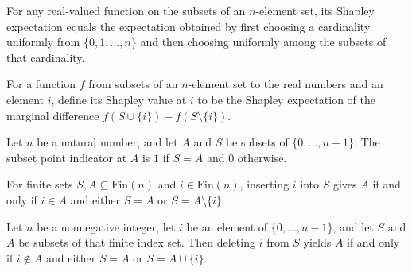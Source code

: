 \begin{theorem}
\label{FABL.shapleyExpectation_eq_uniform_cardinality_then_subset}
\leanok
{}
For any real-valued function on the subsets of an $n$-element set, its Shapley
expectation equals the expectation obtained by first choosing a cardinality uniformly
from $\{0,1,\ldots,n\}$ and then choosing uniformly among the subsets of that cardinality.
\end{theorem}

\begin{definition}
\label{FABL.shapleyValue}
\leanok
{}
For a function $f$ from subsets of an $n$-element set to the real numbers and an element
$i$, define its Shapley value at $i$ to be the Shapley expectation of the marginal
difference $f(S\cup\{i\})-f(S\setminus\{i\})$.
\end{definition}

\begin{definition}
\label{FABL.subsetPointIndicator}
\leanok
Let $n$ be a natural number, and let $A$ and $S$ be subsets of $\{0,\ldots,n-1\}$. The
subset point indicator at $A$ is $1$ if $S=A$ and $0$ otherwise.
\end{definition}

\begin{theorem}
\label{FABL.insert_eq_fixed_iff}
\leanok
{}
For finite sets $S,A\subseteq\mathrm{Fin}(n)$ and $i\in\mathrm{Fin}(n)$, inserting $i$
into $S$ gives $A$ if and only if $i\in A$ and either $S=A$ or $S=A\setminus\{i\}$.
\end{theorem}

\begin{theorem}
\label{FABL.erase_eq_fixed_iff}
\leanok
{}
Let $n$ be a nonnegative integer, let $i$ be an element of $\{0,\ldots,n-1\}$, and let
$S$ and $A$ be subsets of that finite index set. Then deleting $i$ from $S$ yields $A$
if and only if $i\notin A$ and either $S=A$ or $S=A\cup\{i\}$.
\end{theorem}

